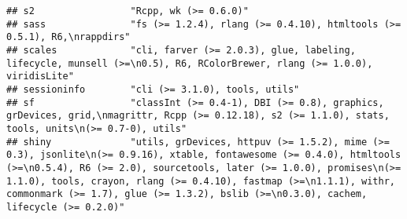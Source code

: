 \documentclass[
]{article}
\begin{document}
\begin{verbatim}
## s2                 "Rcpp, wk (>= 0.6.0)"                                                                                                                                                                                                                                                                                                                                                                                                                        
## sass               "fs (>= 1.2.4), rlang (>= 0.4.10), htmltools (>= 0.5.1), R6,\nrappdirs"                                                                                                                                                                                                                                                                                                                                                                      
## scales             "cli, farver (>= 2.0.3), glue, labeling, lifecycle, munsell (>=\n0.5), R6, RColorBrewer, rlang (>= 1.0.0), viridisLite"                                                                                                                                                                                                                                                                                                                      
## sessioninfo        "cli (>= 3.1.0), tools, utils"                                                                                                                                                                                                                                                                                                                                                                                                               
## sf                 "classInt (>= 0.4-1), DBI (>= 0.8), graphics, grDevices, grid,\nmagrittr, Rcpp (>= 0.12.18), s2 (>= 1.1.0), stats, tools, units\n(>= 0.7-0), utils"                                                                                                                                                                                                                                                                                          
## shiny              "utils, grDevices, httpuv (>= 1.5.2), mime (>= 0.3), jsonlite\n(>= 0.9.16), xtable, fontawesome (>= 0.4.0), htmltools (>=\n0.5.4), R6 (>= 2.0), sourcetools, later (>= 1.0.0), promises\n(>= 1.1.0), tools, crayon, rlang (>= 0.4.10), fastmap (>=\n1.1.1), withr, commonmark (>= 1.7), glue (>= 1.3.2), bslib (>=\n0.3.0), cachem, lifecycle (>= 0.2.0)"                                                                                    

\end{verbatim}
\end{document}
